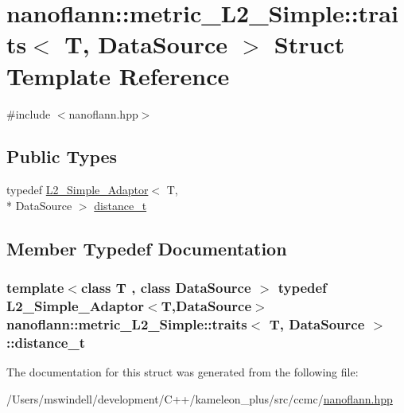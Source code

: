 \hypertarget{structnanoflann_1_1metric___l2___simple_1_1traits}{\section{nanoflann\-:\-:metric\-\_\-\-L2\-\_\-\-Simple\-:\-:traits$<$ T, Data\-Source $>$ Struct Template Reference}
\label{structnanoflann_1_1metric___l2___simple_1_1traits}
}


{\ttfamily \#include $<$nanoflann.\-hpp$>$}

\subsection*{Public Types}
\begin{DoxyCompactItemize}
\item 
typedef \hyperlink{structnanoflann_1_1_l2___simple___adaptor}{L2\-\_\-\-Simple\-\_\-\-Adaptor}$<$ T, \\*
Data\-Source $>$ \hyperlink{structnanoflann_1_1metric___l2___simple_1_1traits_aae46920bee1091763a689b896d3b05c9}{distance\-\_\-t}
\end{DoxyCompactItemize}


\subsection{Member Typedef Documentation}
\hypertarget{structnanoflann_1_1metric___l2___simple_1_1traits_aae46920bee1091763a689b896d3b05c9}{
\subsubsection[{distance\-\_\-t}]{\setlength{\rightskip}{0pt plus 5cm}template$<$class T , class Data\-Source $>$ typedef {\bf L2\-\_\-\-Simple\-\_\-\-Adaptor}$<$T,Data\-Source$>$ {\bf nanoflann\-::metric\-\_\-\-L2\-\_\-\-Simple\-::traits}$<$ T, Data\-Source $>$\-::{\bf distance\-\_\-t}}}\label{structnanoflann_1_1metric___l2___simple_1_1traits_aae46920bee1091763a689b896d3b05c9}


The documentation for this struct was generated from the following file\-:\begin{DoxyCompactItemize}
\item 
/\-Users/mswindell/development/\-C++/kameleon\-\_\-plus/src/ccmc/\hyperlink{nanoflann_8hpp}{nanoflann.\-hpp}\end{DoxyCompactItemize}
